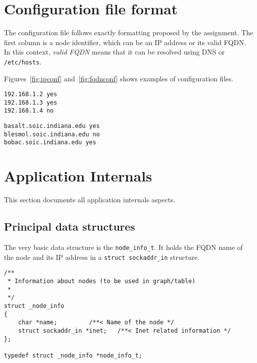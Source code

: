 \documentclass[10pt]{extarticle}
\begin{document}
\section{Configuration file format}

The configuration file follows exactly formatting proposed by the
assignment. The first column is a node identifier, which can be an IP address or
its valid FQDN. In this context, \emph{valid FQDN} means that it can be resolved
using DNS or \texttt{/etc/hosts}.

Figures~\ref{fig:ipconf} and~\ref{fig:fqdnconf} shows examples of configuration files.
\begin{figure*}[!h]
\begin{minipage}[t]{0.4\textwidth}
\begin{Verbatim}[frame=single,framesep=10mm]
192.168.1.2 yes
192.168.1.3 yes
192.168.1.4 no
\end{Verbatim}
\caption{IP-based configuration file}
\label{fig:ipconf}
\end{minipage}
\hfill
\begin{minipage}[t]{0.4\textwidth}
\begin{Verbatim}[frame=single,framesep=10mm]
basalt.soic.indiana.edu yes
blesmol.soic.indiana.edu no
bobac.soic.indiana.edu yes
\end{Verbatim}
\caption{FQDN-based configuration file}
\label{fig:fqdnconf}
\end{minipage}
\end{figure*}

\section{Application Internals}

This section documents all application internals aspects.

\subsection{Principal data structures}

The very basic data structure is the \texttt{node\_info\_t}. It holds the FQDN
name of the node and its IP address in a \texttt{struct sockaddr\_in}
structure.

\begin{lstlisting}
/**
 * Information about nodes (to be used in graph/table)
 * 
 */
struct _node_info
{
    char *name;			/**< Name of the node */
    struct sockaddr_in *inet;	/**< Inet related information */
};

typedef struct _node_info *node_info_t;
\end{lstlisting}
\end{document}
